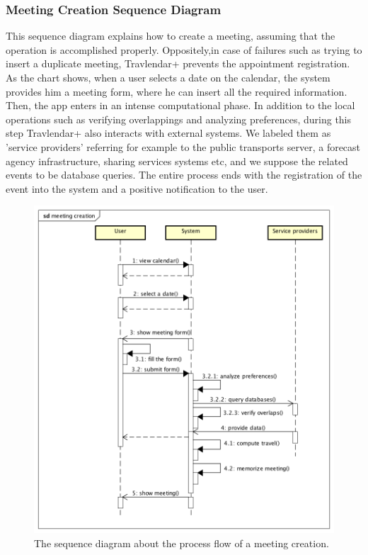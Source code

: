 \subsubsection{Meeting Creation Sequence Diagram}

This sequence diagram explains how to create a meeting, assuming that the operation is accomplished properly.
Oppositely,in case of failures such as trying to insert a duplicate meeting, Travlendar+ prevents the appointment registration. 
As the chart shows, when a user selects a date on the calendar, the system provides him a meeting form, where he can insert all the required information. Then, the app enters in an intense computational phase. In addition to the local operations such as verifying overlappings and analyzing preferences, during this step Travlendar+ also interacts with external systems. 
We labeled them as 'service providers' referring for example to the public transports server, a forecast agency infrastructure, sharing services systems etc, and we suppose the related events to be database queries. 
The entire process ends with the registration of the event into the system and a positive notification to the user. 

\begin{figure}[htp]
	
	\centering
	\includegraphics[width=\textwidth]{sequencediagrams/meetingcreation}
	\caption{The sequence diagram about the process flow of a meeting creation.}
	\label{fig:meetingcreation}
		
\end{figure}
\newpage

